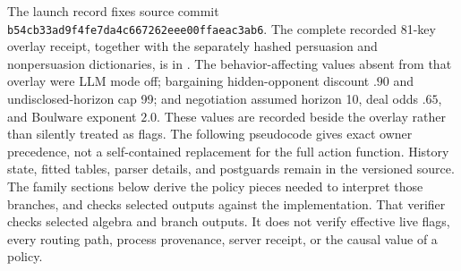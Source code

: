 The launch record fixes source commit
\texttt{b54cb33ad9f4fe7da4c667262eee00ffaeac3ab6}. The complete recorded 81-key
overlay receipt, together with the separately hashed persuasion and
nonpersuasion dictionaries, is in
.
The behavior-affecting values absent from that overlay were LLM mode off;
bargaining hidden-opponent discount $.90$ and undisclosed-horizon cap 99; and
negotiation assumed horizon 10, deal odds $.65$, and Boulware exponent $2.0$.
These values are recorded beside the overlay rather than silently treated as
flags. The following pseudocode
gives exact owner precedence, not a self-contained replacement for the full
action function. History state, fitted tables, parser details, and postguards
remain in the versioned source. The family sections below derive the policy
pieces needed to interpret those branches, and
 checks selected outputs against the
implementation.
That verifier checks selected algebra and branch outputs. It does not verify
effective live flags, every routing path, process provenance, server receipt, or
the causal value of a policy.

